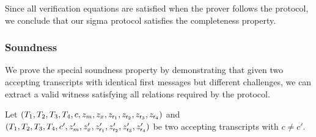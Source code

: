 Since all verification equations are satisfied when the prover follows the protocol, we conclude that our sigma protocol satisfies the completeness property.


\subsubsection*{Soundness}
We prove the special soundness property by demonstrating that given two accepting transcripts with identical first messages but different challenges, we can extract a valid witness satisfying all relations required by the protocol.

Let $(T_1, T_2, T_3, T_4, c, z_m, z_x, z_{\mathsf{r}_1}, z_{\mathsf{r}_2}, z_{\mathsf{r}_3}, z_{\mathsf{r}_4})$ and $(T_1, T_2, T_3, T_4, c', z'_m, z'_x, z'_{\mathsf{r}_1}, z'_{\mathsf{r}_2}, z'_{\mathsf{r}_3}, z'_{\mathsf{r}_4})$ be two accepting transcripts with $c \neq c'$.

